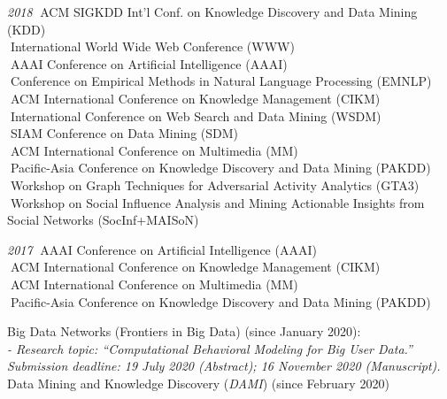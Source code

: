 \documentclass[10pt]{article}
\newenvironment{myindentpar}[1]%
{\begin{list}{}%
         {\setlength{\leftmargin}{#1}}%
         \item[]%
}
{\end{list}}
\newcounter{list}
\begin{document}
\begin{myindentpar}{0.75cm}
{\hspace{-0.75cm}\textit{2018}
\textcolor{white}{.}ACM SIGKDD Int'l Conf. on Knowledge Discovery and Data Mining (KDD) \\
\textcolor{white}{.}International World Wide Web Conference (WWW) \\
\textcolor{white}{.}AAAI Conference on Artificial Intelligence (AAAI) \\
\textcolor{white}{.}Conference on Empirical Methods in Natural Language Processing (EMNLP) \\
\textcolor{white}{.}ACM International Conference on Knowledge Management (CIKM) \\
\textcolor{white}{.}International Conference on Web Search and Data Mining (WSDM) \\
\textcolor{white}{.}SIAM Conference on Data Mining (SDM) \\
\textcolor{white}{.}ACM International Conference on Multimedia (MM) \\
\textcolor{white}{.}Pacific-Asia Conference on Knowledge Discovery and Data Mining (PAKDD) \\
\textcolor{white}{.}Workshop on Graph Techniques for Adversarial Activity Analytics (GTA3) \\
\textcolor{white}{.}Workshop on Social Influence Analysis and Mining Actionable Insights from Social Networks (SocInf+MAISoN)

\hspace{-0.75cm}\textit{2017}
\textcolor{white}{.}AAAI Conference on Artificial Intelligence (AAAI) \\
\textcolor{white}{.}ACM International Conference on Knowledge Management (CIKM) \\
\textcolor{white}{.}ACM International Conference on Multimedia (MM) \\
\textcolor{white}{.}Pacific-Asia Conference on Knowledge Discovery and Data Mining (PAKDD)

}

\hspace{-0.75cm}{\bf Editorial Board}

{\small

Big Data Networks (Frontiers in Big Data) (since January 2020): \\
\textit{- Research topic: ``Computational Behavioral Modeling for Big User Data.'' Submission deadline: 19 July 2020 (Abstract); 16 November 2020 (Manuscript).} \\
Data Mining and Knowledge Discovery (\textit{DAMI}) (since February 2020)

}
\end{myindentpar}
\end{document}
